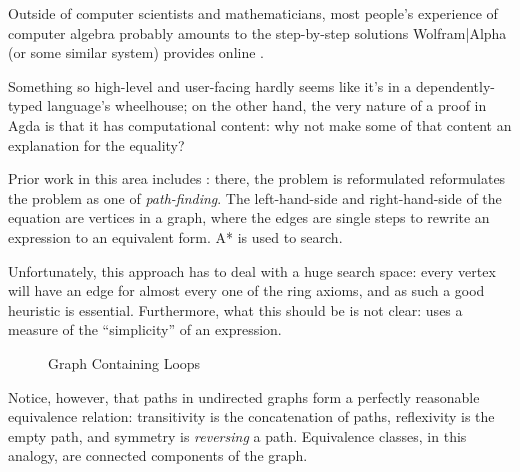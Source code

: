 \documentclass[acmsmall,review,anonymous]{acmart}\settopmatter{printfolios=true,printccs=false,printacmref=false}
\theoremstyle{remark}
\begin{document}
Outside of computer scientists and mathematicians, most people's experience of
computer algebra probably amounts to the step-by-step solutions Wolfram|Alpha
(or some similar system) provides online
\cite{the_development_team_step-by-step_2009}.

Something so high-level and user-facing hardly seems like it's in a
dependently-typed language's wheelhouse; on the other hand, the very nature of a
proof in Agda is that it has computational content: why not make some of that
content an explanation for the equality?

Prior work in this area includes \citet{lioubartsev_constructing_2016}: there,
the problem is reformulated  reformulates the problem as one of
\emph{path-finding}. The left-hand-side and right-hand-side of the equation are
vertices in a graph, where the edges are single steps to rewrite an expression
to an equivalent form. A* is used to search.

Unfortunately, this approach has to deal with a huge search space: every vertex
will have an edge for almost every one of the ring axioms, and as such a good
heuristic is essential. Furthermore, what this should be is not clear:
\citet{lioubartsev_constructing_2016} uses a measure of the ``simplicity'' of an
expression.

\begin{figure}
  \vspace{-10pt}
  \vspace{-15pt}
  \caption{Graph Containing Loops}
  \label{h-graph}
  \vspace{-20pt}
\end{figure}


Notice, however, that paths in undirected graphs form a perfectly reasonable
equivalence relation: transitivity is the concatenation of paths, reflexivity is
the empty path, and symmetry is \emph{reversing} a path. Equivalence classes, in
this analogy, are connected components of the graph.
\end{document}
